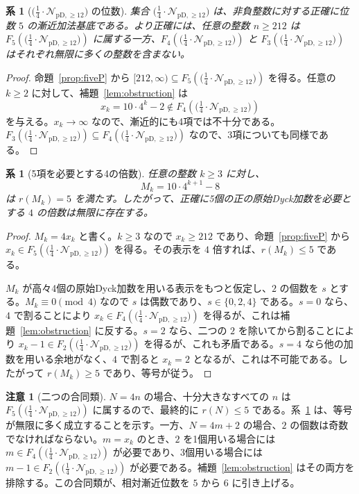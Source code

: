 \documentclass[12pt]{ltjsarticle}
\theoremstyle{plain}
\newtheorem{corollary}[theorem]{系}
\theoremstyle{definition}
\newtheorem{remark}[theorem]{注意}
\theoremstyle{plain}
\newcommand{\Pset}{%
  \bigl(\tfrac{1}{4}\cdot\mathcal{N}_{\mathrm{pD},\geq 12}\bigr)%
}
\begin{document}
\begin{corollary}[$\Pset$ の位数]\label{cor:orderfive}
集合 $\Pset$ は、非負整数に対する正確に位数 $5$ の漸近加法基底である。より正確には、任意の整数 $n\geq212$ は $F_5(\Pset)$ に属する一方、$F_4(\Pset)$ と $F_3(\Pset)$ はそれぞれ無限に多くの整数を含まない。
\end{corollary}

\begin{proof}
命題~\ref{prop:fiveP} から $[212,\infty)\subseteq F_5(\Pset)$ を得る。任意の $k\geq2$ に対して、補題~\ref{lem:obstruction} は
\[
  x_k=10\cdot4^k-2\notin F_4(\Pset)
\]
を与える。$x_k\to\infty$ なので、漸近的にも4項では不十分である。$F_3(\Pset)\subseteq F_4(\Pset)$ なので、3項についても同様である。
\end{proof}

\begin{corollary}[5項を必要とする4の倍数]
\label{cor:five-multiples}
任意の整数 $k\geq3$ に対し、
\[
  M_k=10\cdot4^{k+1}-8
\]
は $r(M_k)=5$ を満たす。したがって、正確に5個の正の原始Dyck加数を必要とする $4$ の倍数は無限に存在する。
\end{corollary}

\begin{proof}
$M_k=4x_k$ と書く。$k\geq3$ なので $x_k\geq212$ であり、命題~\ref{prop:fiveP} から $x_k\in F_5(\Pset)$ を得る。その表示を $4$ 倍すれば、$r(M_k)\leq5$ である。

$M_k$ が高々4個の原始Dyck加数を用いる表示をもつと仮定し、$2$ の個数を $s$ とする。$M_k\equiv0\pmod4$ なので $s$ は偶数であり、$s\in\{0,2,4\}$ である。$s=0$ なら、$4$ で割ることにより $x_k\in F_4(\Pset)$ を得るが、これは補題~\ref{lem:obstruction} に反する。$s=2$ なら、二つの $2$ を除いてから割ることにより $x_k-1\in F_2(\Pset)$ を得るが、これも矛盾である。$s=4$ なら他の加数を用いる余地がなく、$4$ で割ると $x_k=2$ となるが、これは不可能である。したがって $r(M_k)\geq5$ であり、等号が従う。
\end{proof}

\begin{remark}[二つの合同類]
$N=4n$ の場合、十分大きなすべての $n$ は $F_5(\Pset)$ に属するので、最終的に $r(N)\leq5$ である。系~\ref{cor:five-multiples} は、等号が無限に多く成立することを示す。一方、$N=4m+2$ の場合、$2$ の個数は奇数でなければならない。$m=x_k$ のとき、$2$ を1個用いる場合には $m\in F_4(\Pset)$ が必要であり、3個用いる場合には $m-1\in F_2(\Pset)$ が必要である。補題~\ref{lem:obstruction} はその両方を排除する。この合同類が、相対漸近位数を $5$ から $6$ に引き上げる。
\end{remark}
\end{document}
